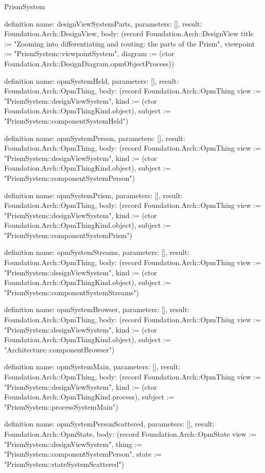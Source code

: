 \begin{lexlean}{PrismSystem}
\begin{semanticmodule}
definition{
  name: designViewSystemParts,
  parameters: [],
  result: Foundation.Arch::DesignView,
  body: (record Foundation.Arch::DesignView {title := "Zooming into differentiating and routing: the parts of the Prism", viewpoint := "PrismSystem::viewpointSystem", diagram := (ctor Foundation.Arch::DesignDiagram.opmObjectProcess)})
}

definition{
  name: opmSystemHeld,
  parameters: [],
  result: Foundation.Arch::OpmThing,
  body: (record Foundation.Arch::OpmThing {view := "PrismSystem::designViewSystem", kind := (ctor Foundation.Arch::OpmThingKind.object), subject := "PrismSystem::componentSystemHeld"})
}

definition{
  name: opmSystemPerson,
  parameters: [],
  result: Foundation.Arch::OpmThing,
  body: (record Foundation.Arch::OpmThing {view := "PrismSystem::designViewSystem", kind := (ctor Foundation.Arch::OpmThingKind.object), subject := "PrismSystem::componentSystemPerson"})
}

definition{
  name: opmSystemPrism,
  parameters: [],
  result: Foundation.Arch::OpmThing,
  body: (record Foundation.Arch::OpmThing {view := "PrismSystem::designViewSystem", kind := (ctor Foundation.Arch::OpmThingKind.object), subject := "PrismSystem::componentSystemPrism"})
}

definition{
  name: opmSystemStreams,
  parameters: [],
  result: Foundation.Arch::OpmThing,
  body: (record Foundation.Arch::OpmThing {view := "PrismSystem::designViewSystem", kind := (ctor Foundation.Arch::OpmThingKind.object), subject := "PrismSystem::componentSystemStreams"})
}

definition{
  name: opmSystemBrowser,
  parameters: [],
  result: Foundation.Arch::OpmThing,
  body: (record Foundation.Arch::OpmThing {view := "PrismSystem::designViewSystem", kind := (ctor Foundation.Arch::OpmThingKind.object), subject := "Architecture::componentBrowser"})
}

definition{
  name: opmSystemMain,
  parameters: [],
  result: Foundation.Arch::OpmThing,
  body: (record Foundation.Arch::OpmThing {view := "PrismSystem::designViewSystem", kind := (ctor Foundation.Arch::OpmThingKind.process), subject := "PrismSystem::processSystemMain"})
}

definition{
  name: opmSystemPersonScattered,
  parameters: [],
  result: Foundation.Arch::OpmState,
  body: (record Foundation.Arch::OpmState {view := "PrismSystem::designViewSystem", thing := "PrismSystem::componentSystemPerson", state := "PrismSystem::stateSystemScattered"})
}


\end{semanticmodule}
\end{lexlean}
